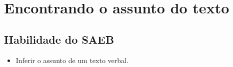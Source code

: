 \chapter{Encontrando o assunto do texto}

\enlargethispage{2\baselineskip}

\section*{Habilidade do SAEB}

\begin{itemize}
\item Inferir o assunto de um texto verbal.
\end{itemize}


